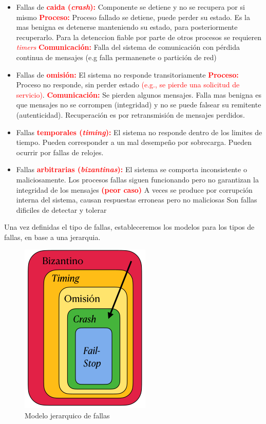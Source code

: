 \begin{itemize}
    \item Fallas de \textcolor{red}{\textbf{caida (\textit{crash}):}} Componente se detiene y no se recupera por si mismo
    \subitem \textcolor{red}{\textbf{Proceso:}} Proceso fallado se detiene, puede perder su estado. Es la mas benigna es detenerse manteniendo su estado, para posteriormente recuperarlo. Para la detenccion fiable por parte de otros procesos se requieren \textcolor{red}{\textit{timers}}
    \subitem \textcolor{red}{\textbf{Comunicación:}} Falla del sistema de comunicación con pérdida continua de mensajes (e.g falla permanenete o partición de red)

    \item Fallas de \textcolor{red}{\textbf{omisión:}} El sistema no responde transitoriamente
    \subitem \textcolor{red}{\textbf{Proceso:}} Proceso no responde, sin perder estado \textcolor{red}{(e.g., se pierde una solicitud de servicio)}.
    \subitem \textcolor{red}{\textbf{Comunicación:}} Se pierden algunos mensajes. Falla mas benigna es que mensajes no se corrompen (integridad) y no se puede falsear su
    remitente (autenticidad). Recuperación es por retransmisión de mensajes perdidos.

    \item Fallas \textcolor{red}{\textbf{temporales (\textit{timing}):}} El sistema no responde dentro de los limites de tiempo.
    \subitem Pueden corresponder a un mal desempeño por sobrecarga. 
    \subitem Pueden ocurrir por fallas de relojes.

    \item Fallas \textcolor{red}{\textbf{arbitrarias (\textit{bizantinas}):}} El sistema se comporta inconsistente o maliciosamente.
    \subitem Los procesos fallas siguen funcionando pero no garantizan la integridad de los mensajes \textcolor{red}{\textbf{(peor caso)}}
    \subitem A veces se produce por corrupción interna del sistema, causan respuestas erroneas pero no maliciosas
    \subitem Son fallas dificiles de detectar y tolerar
\end{itemize}

Una vez definidas el tipo de fallas, estableceremos los modelos para los tipos de fallas, en base a una jerarquia.
\begin{figure}[H]
    \centering
    \includegraphics[width=0.3\linewidth]{img/modelo_de_fallas.png}
    \caption{Modelo jerarquico de fallas}\label{fig:1761584179354}
\end{figure}

